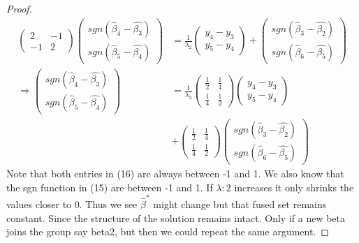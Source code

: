 \documentclass{article}
\theoremstyle{definition}
\DeclareMathOperator*{\sgn}{sgn}
\begin{document}
\begin{proof}
\begin{align}
\left(\begin{matrix}2&-1\\-1&2\end{matrix}\right)\left(\begin{matrix}sgn(\hat{\beta}_4-\hat{\beta_3})\\sgn(\hat{\beta}_5-\hat{\beta_4})\end{matrix}\right)&=\frac{1}{\lambda_2} \left(\begin{matrix}y_4-y_3\\y_5-y_4\end{matrix}\right) + \left(\begin{matrix}sgn(\hat{\beta}_3-\hat{\beta_2})\\sgn(\hat{\beta}_6-\hat{\beta_5})\end{matrix}\right) \\ \Rightarrow \left(\begin{matrix}sgn(\hat{\beta}_4-\hat{\beta_3})\\sgn(\hat{\beta}_5-\hat{\beta_4})\end{matrix}\right)&=\frac{1}{\lambda_2} \left(\begin{matrix}\frac{1}{2}&\frac{1}{4}\\\frac{1}{4}&\frac{1}{2}\end{matrix}\right)   \left(\begin{matrix}y_4-y_3\\y_5-y_4\end{matrix}\right) \\ &+  \left(\begin{matrix}\frac{1}{2}&\frac{1}{4}\\\frac{1}{4}&\frac{1}{2}\end{matrix}\right)      
  \left(\begin{matrix}sgn(\hat{\beta}_3-\hat{\beta_2})\\sgn(\hat{\beta}_6-\hat{\beta_5})\end{matrix}\right)
\end{align}
Note that both entries in (16) are always between -1 and 1. We also know that the sgn function in (15) are between -1 and 1. If $\lambda:2$ increases it only shrinks the values closer to 0. Thus we see $\hat{\beta}^*$ might change but that fused set remains constant. Since the structure of the solution remains intact. Only if a new beta joins the group say beta2, but then we could repeat the same argument.
\end{proof}


\listoftodos


\newpage

\end{document}
